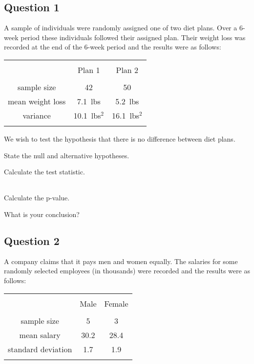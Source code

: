 \documentclass[a4paper,12pt]{article}
\begin{document}
\subsection*{Question 1}
A sample of individuals were randomly assigned one of two diet plans. 
Over a 6-week period these individuals followed their assigned plan. 
Their weight loss was recorded at the end of the 6-week period and the results were as follows: \\
\begin{center}
\begin{tabular}{|c|c|c|}
\hline
&&\\[-0.4cm]
& Plan 1 & Plan 2 \\
\hline
&&\\[-0.4cm]
sample size & 42 & 50 \\
mean weight loss & 7.1\,\,\,lbs & 5.2\,\,\,lbs \\
variance & 10.1\,\,\,lbs$^2$ & 16.1\,\,\,lbs$^2$ \\
\hline
\multicolumn{3}{c}{}\\
\end{tabular}
\end{center}

We wish to test the hypothesis that there is no difference between diet plans.\\[0.2cm]
\item  State the null and alternative hypotheses. 
 
\item  Calculate the test statistic. 
 
\item \\ Calculate the p-value. 
 
\item  What is your conclusion?


\subsection*{Question 2}
A company claims that it pays men and women equally. The salaries for some randomly selected employees (in thousands) were recorded and the results were as follows:\\
\begin{center}
\begin{tabular}{|c|c|c|}
\hline
&&\\[-0.4cm]
& Male & Female \\
\hline
&&\\[-0.4cm]
sample size & 5 & 3 \\
mean salary & 30.2 & 28.4 \\
standard deviation & 1.7 & 1.9 \\
\hline
\multicolumn{3}{c}{}\\
\end{tabular}
\end{center}
\end{document}
